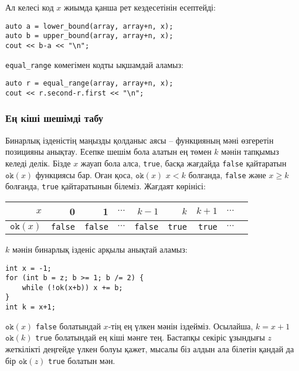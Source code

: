 Ал келесі код $x$ жиымда қанша рет кездесетінін есептейді:

\begin{lstlisting}
auto a = lower_bound(array, array+n, x);
auto b = upper_bound(array, array+n, x);
cout << b-a << "\n";
\end{lstlisting}

\texttt{equal\_range} көмегімен кодты ықшамдай аламыз:

\begin{lstlisting}
auto r = equal_range(array, array+n, x);
cout << r.second-r.first << "\n";
\end{lstlisting}

\subsubsection{Ең кіші шешімді табу}

Бинарлық ізденістің маңызды қолданыс аясы --
функцияның мәні өзгеретін позицияны анықтау.
Есепке шешім бола алатын ең төмен $k$ мәнін
тапқымыз келеді делік.
Бізде $x$ жауап бола алса, \texttt{true}, басқа жағдайда
\texttt{false} қайтаратын $\texttt{ok}(x)$ функциясы бар.
Оған қоса, $\texttt{ok}(x)$ $x<k$ болғанда, \texttt{false}
және $x \ge k$ болғанда, \texttt{true} қайтаратынын білеміз.
Жағдаят көрінісі:

\begin{center}
\begin{tabular}{r|rrrrrrrr}
$x$ & 0 & 1 & $\cdots$ & $k-1$ & $k$ & $k+1$ & $\cdots$ \\
\hline
$\texttt{ok}(x)$ & \texttt{false} & \texttt{false}
& $\cdots$ & \texttt{false} & \texttt{true} & \texttt{true} & $\cdots$ \\
\end{tabular}
\end{center}

\noindent
$k$ мәнін бинарлық ізденіс арқылы анықтай аламыз:

\begin{lstlisting}
int x = -1;
for (int b = z; b >= 1; b /= 2) {
    while (!ok(x+b)) x += b;
}
int k = x+1;
\end{lstlisting}

$\texttt{ok}(x)$ \texttt{false} болатындай 
$x$-тің ең үлкен мәнін іздейміз. Осылайша, $k=x+1$
$\texttt{ok}(k)$ \texttt{true} болатындай
ең кіші мәнге тең.
Бастапқы секіріс ұзындығы $z$ жеткілікті
деңгейде үлкен болуы қажет,
мысалы біз алдын ала білетін қандай да бір
$\texttt{ok}(z)$ \texttt{true} болатын мән.

